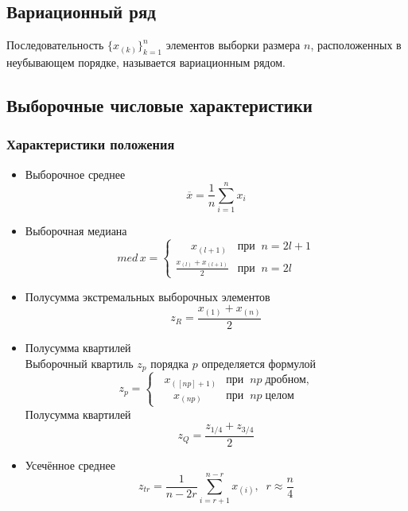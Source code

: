 \documentclass[a4paper]{article}
\begin{document}
\subsection{Вариационный ряд}
Последовательность $\displaystyle\{x_{(k)}\}_{k=1}^n$ элементов выборки размера $n$, расположенных в неубывающем порядке, называется вариационным рядом.
\subsection{Выборочные числовые характеристики}
\subsubsection{Характеристики положения}
\begin{itemize}
    \item Выборочное среднее
    \begin{equation}\label{mean}
        \overline{x}=\frac{1}{n}\sum_{i=1}^n x_i
    \end{equation}
    \item Выборочная медиана
    \begin{equation}\label{med}
        med\,x = \begin{cases}
        \displaystyle\;\;\;\;\;x_{(l+1)}&\text{при}\;\;n=2l+1\\
        \displaystyle\frac{x_{(l)}+x_{(l+1)}}{2}&\text{при}\;\;n=2l
        \end{cases}
    \end{equation}
    \item Полусумма экстремальных выборочных элементов
    \begin{equation}\label{exhfsum}
        z_R=\frac{x_{(1)}+x_{(n)}}{2}
    \end{equation}
    \item Полусумма квартилей\\
    Выборочный квартиль $z_p$ порядка $p$ определяется формулой
    \begin{equation}
        z_p = \begin{cases}\label{pqv}
        \displaystyle\;\;x_{([np]+1)}&\text{при}\;\;np\;\text{дробном,}\\
        \displaystyle\;\;\;\;\;x_{(np)}&\text{при}\;\;np\;\text{целом}
        \end{cases}
    \end{equation}
    Полусумма квартилей
    \begin{equation}\label{hfsum}
        z_Q=\frac{z_{1/4}+z_{3/4}}{2}
    \end{equation}
    \item Усечённое среднее
    \begin{equation}\label{trmean}
        z_{tr}=\frac{1}{n-2r}\sum_{i=r+1}^{n-r}x_{(i)},\;\;r\approx\frac{n}{4}
    \end{equation}
\end{itemize}
\end{document}
